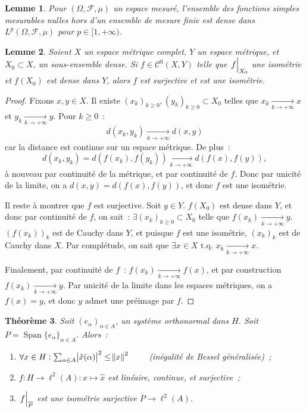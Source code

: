 \documentclass{report}
\DeclareMathOperator{\Span}{Span}
\newcommand{\tq}{\text{ t.q. }}
\newcommand{\pinfty}{{+\infty}}
\newcommand{\restr}[2]{\left.#1\vphantom{\big|}\right|_{#2}}
\newtheorem{thm}{Théorème}[chapter]
\newtheorem{lem}[thm]{Lemme}
\theoremstyle{definition}
\theoremstyle{remark}
\begin{document}
\begin{lem} Pour $(\Omega, \mathcal F, \mu)$ un espace mesuré, l'ensemble des fonctions simples mesurables nulles hors d'un ensemble de mesure finie est dense dans
$L^p(\Omega, \mathcal F, \mu)$ pour $p \in [1, \pinfty)$.
\end{lem}

\begin{lem}\label{lem:isométrie dense} Soient $X$ un espace métrique complet, $Y$ un espace métrique, et $X_0 \subset X$, un sous-ensemble dense.
Si $f \in \mathcal C^0(X, Y)$ telle que $\restr f{X_0}$  une isométrie et $f(X_0)$ est dense dans $Y$, alors $f$ est surjective et est une isométrie.
\end{lem}

\begin{proof} Fixons $x, y \in X$. Il existe $(x_k)_{k \geq 0}, (y_k)_{k \geq 0} \subset X_0$ telles que $x_k \xrightarrow[k \to \pinfty]{} x$ et $y_k \xrightarrow[k \to \pinfty]{} y$.
Pour $k \geq 0$~:
\[d(x_k, y_k) \xrightarrow[k \to \pinfty]{} d(x, y)\]
car la distance est continue sur un espace métrique. De plus~:
\[d(x_k, y_k) = d\left(f(x_k), f(y_k)\right) \xrightarrow[k \to \pinfty]{} d\left(f(x), f(y)\right),\]
à nouveau par continuité de la métrique, et par continuité de $f$. Donc par unicité de la limite, on a $d(x, y) = d(f(x), f(y))$, et donc $f$ est une isométrie.

Il reste à montrer que $f$ est surjective. Soit $y \in Y$. $f(X_0)$ est dense dans $Y$, et donc par continuité de $f$, on sait~: $\exists (x_k)_{k \geq 0} \subset {X_0}$ telle que
$f(x_k) \xrightarrow[k \to \pinfty]{} y$. $(f(x_k))_k$ est de Cauchy dans $Y$, et puisque $f$ est une isométrie, $(x_k)_k$ est de Cauchy dans $X$. Par complétude, on sait
que $\exists x \in X \tq x_k \xrightarrow[k \to \pinfty]{} x$.

Finalement, par continuité de $f$~: $f(x_k) \xrightarrow[k \to \pinfty]{} f(x)$, et par construction $f(x_k) \xrightarrow[k \to \pinfty]{} y$. Par unicité de la limite dans les
espaces métriques, on a $f(x) = y$, et donc $y$ admet une préimage par $f$.
\end{proof}

\begin{thm}\label{thm:cefficients Fourier isométrie} Soit $(e_\alpha)_{\alpha \in A}$, un système orthonormal dans $H$. Soit $P = \Span \{e_\alpha\}_{\alpha \in A}$. Alors~:
\begin{enumerate}
	\item $\forall x \in H : \sum_{\alpha \in A}\abs {\hat x(\alpha)}^2 \leq \norm x^2 \qquad$ (inégalité de Bessel généralisée)~;
	\item $f : H \to \ell^2(A) : x \mapsto \hat x$ est linéaire, continue, et surjective~;
	\item $\restr f{\overline P}$ est une isométrie surjective $\overline P \to \ell^2(A)$.
\end{enumerate}
\end{thm}
\end{document}
